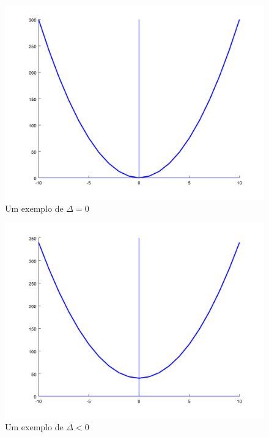 \documentclass[11pt]{article}
\begin{document}
\begin{figure}[H]
	\centering
	\includegraphics[width=0.8\linewidth]{imgs2/chart6.png}
	\caption{Um exemplo de $\Delta = 0$}
\end{figure}

\begin{figure}[H]
	\centering
	\includegraphics[width=0.8\linewidth]{imgs2/chart7.png}
	\caption{Um exemplo de $\Delta < 0$}
\end{figure}

\newpage
\end{document}
